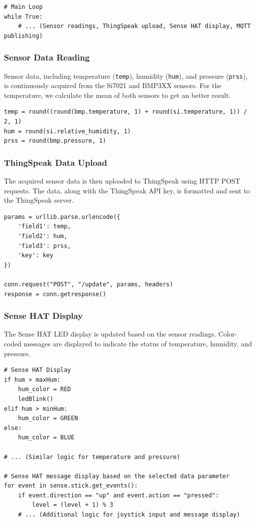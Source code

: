 \documentclass[titlepage]{article}
\begin{document}
\begin{verbatim}
# Main Loop
while True:
    # ... (Sensor readings, ThingSpeak upload, Sense HAT display, MQTT publishing)

\end{verbatim}


\subsubsection{Sensor Data Reading}
Sensor data, including temperature (\texttt{temp}), humidity (\texttt{hum}), and pressure (\texttt{prss}), is continuously acquired from the Si7021 and BMP3XX sensors.
For the temperature, we calculate the mean of both sensors to get an better result.

\begin{verbatim}
temp = round((round(bmp.temperature, 1) + round(si.temperature, 1)) / 2, 1)
hum = round(si.relative_humidity, 1)
prss = round(bmp.pressure, 1)
\end{verbatim}

\subsubsection{ThingSpeak Data Upload}
The acquired sensor data is then uploaded to ThingSpeak using HTTP POST requests. The data, along with the ThingSpeak API key, is formatted and sent to the ThingSpeak server.

\begin{verbatim}
params = urllib.parse.urlencode({
    'field1': temp,
    'field2': hum,
    'field3': prss,
    'key': key
})

conn.request("POST", "/update", params, headers)
response = conn.getresponse()
\end{verbatim}

\newpage
\subsubsection{Sense HAT Display}
The Sense HAT LED display is updated based on the sensor readings. Color-coded messages are displayed to indicate the status of temperature, humidity, and pressure.

\begin{verbatim}
# Sense HAT Display
if hum > maxHum:
    hum_color = RED
    ledBlink()
elif hum > minHum:
    hum_color = GREEN
else:
    hum_color = BLUE

# ... (Similar logic for temperature and pressure)

# Sense HAT message display based on the selected data parameter
for event in sense.stick.get_events():
    if event.direction == "up" and event.action == "pressed":
        level = (level + 1) % 3
    # ... (Additional logic for joystick input and message display)
\end{verbatim}
\end{document}
